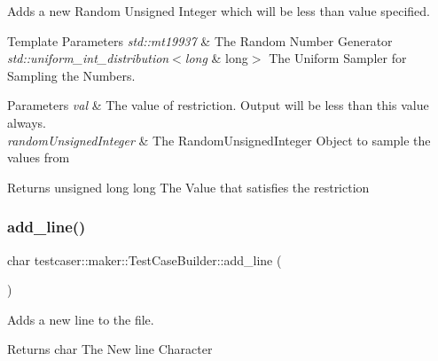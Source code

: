 Adds a new Random Unsigned Integer which will be less than value specified. 


\begin{DoxyTemplParams}{Template Parameters}
{\em std\+::mt19937} & The Random Number Generator \\
\hline
{\em std\+::uniform\+\_\+int\+\_\+distribution$<$long} & long$>$ The Uniform Sampler for Sampling the Numbers. \\
\hline
\end{DoxyTemplParams}

\begin{DoxyParams}{Parameters}
{\em val} & The value of restriction. Output will be less than this value always. \\
\hline
{\em random\+Unsigned\+Integer} & The Random\+Unsigned\+Integer Object to sample the values from \\
\hline
\end{DoxyParams}
\begin{DoxyReturn}{Returns}
unsigned long long The Value that satisfies the restriction 
\end{DoxyReturn}
\mbox{\label{classtestcaser_1_1maker_1_1TestCaseBuilder_abdb7ac9e7f1036c4b84adf48bb019cfa}} 
\subsubsection{\texorpdfstring{add\_line()}{add\_line()}}
{\footnotesize\ttfamily char testcaser\+::maker\+::\+Test\+Case\+Builder\+::add\+\_\+line (\begin{DoxyParamCaption}{ }\end{DoxyParamCaption})\hspace{0.3cm}{\ttfamily [inline]}}



Adds a new line to the file. 

\begin{DoxyReturn}{Returns}
char The New line Character 
\end{DoxyReturn}
\mbox{\label{classtestcaser_1_1maker_1_1TestCaseBuilder_ac6cfa5b3269b899b19fc5b4d2e97b4aa}} 
